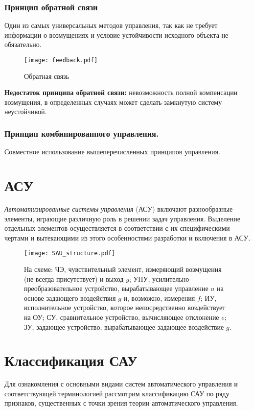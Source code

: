 \documentclass[TAU.tex]{subfiles}
\begin{document}
\subsubsection{Принцип обратной связи}
Один из самых универсальных методов управления, так как не требует информации о возмущениях и условие устойчивости исходного объекта не обязательно.


\begin{figure}[h]
\texttt{[image: feedback.pdf]}
\caption{Обратная связь}
\centering
\end{figure}

{\bf Недостаток принципа обратной связи:} невозможность полной компенсации возмущения, в определенных случаях может сделать замкнутую систему неустойчивой. %

\subsubsection{Принцип комбинированного управления.}
Совместное использование вышеперечисленных принципов управления.

\section{АСУ}

{\it Автоматизированные системы управления} (АСУ) включают разнообразные элементы, играющие различную роль в решении задач управления. Выделение отдельных элементов осуществляется в соответствии с их специфическими чертами и вытекающими из этого особенностями разработки и включения в АСУ. 

\begin{figure}[h]
\texttt{[image: SAU\_structure.pdf]}
\caption{На схеме: 
ЧЭ, чувствительный элемент, измеряющий возмущения (не всегда присутствует)
 и выход $y$; УПУ, усилительно-преобразовательное устройство, вырабатывающее управление $u$ на основе задающего воздействия $g$ и, возможно, измерения $f$; ИУ, исполнительное устройство, которое непосредственно воздействует на ОУ; СУ, сравнительное устройство, вычисляющее отклонение $e$; ЗУ, задающее устройство, вырабатывающее задающее воздействие $g$.}
\centering
\end{figure}


\section{Классификация САУ}
Для ознакомления с основными видами систем автоматического управления и соответствующей терминологией рассмотрим классификацию САУ по ряду признаков, существенных с точки зрения теории автоматического управления. 
\end{document}
